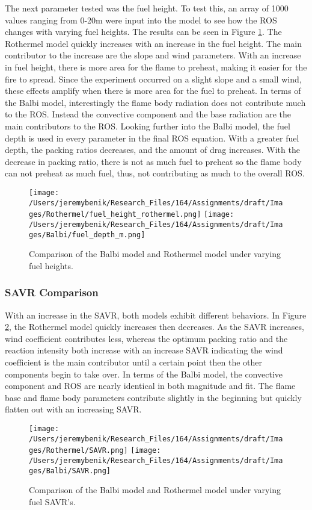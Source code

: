 \documentclass{article}
\begin{document}
\indent The next parameter tested was the fuel height. To test this, an array of 1000 values ranging from 0-20m were input into the model to see how the ROS changes with varying fuel heights. The results can be seen in Figure \ref{fuel height}. The Rothermel model quickly increases with an increase in the fuel height. The main contributor to the increase are the slope and wind parameters. With an increase in fuel height, there is more area for the flame to preheat, making it easier for the fire to spread. Since the experiment occurred on a slight slope and a small wind, these effects amplify when there is more area for the fuel to preheat. In terms of the Balbi model, interestingly the flame body radiation does not contribute much to the ROS. Instead the convective component and the base radiation are the main contributors to the ROS. Looking further into the Balbi model, the fuel depth is used in every parameter in the final ROS equation. With a greater fuel depth, the packing ratios decreases, and the amount of drag increases. With the decrease in packing ratio, there is not as much fuel to preheat so the flame body can not preheat as much fuel, thus, not contributing as much to the overall ROS.
\newpage
\begin{figure}[!h]
\centering
  \texttt{[image: /Users/jeremybenik/Research\_Files/164/Assignments/draft/Images/Rothermel/fuel\_height\_rothermel.png]}
  \texttt{[image: /Users/jeremybenik/Research\_Files/164/Assignments/draft/Images/Balbi/fuel\_depth\_m.png]}
  \caption{Comparison of the Balbi model and Rothermel model under varying fuel heights.}
  \label{fuel height}
\end{figure}
\subsubsection{SAVR Comparison}
\indent With an increase in the SAVR, both models exhibit different behaviors. In Figure \ref{SAVR}, the Rothermel model quickly increases then decreases. As the SAVR increases, wind coefficient contributes less, whereas the optimum packing ratio and the reaction intensity both increase with an increase SAVR indicating the wind coefficient is the main contributor until a certain point then the other components begin to take over. In terms of the Balbi model, the convective component and ROS are nearly identical in both magnitude and fit. The flame base and flame body parameters contribute slightly in the beginning but quickly flatten out with an increasing SAVR.
\newpage
\begin{figure}[!h]
\centering
  \texttt{[image: /Users/jeremybenik/Research\_Files/164/Assignments/draft/Images/Rothermel/SAVR.png]}
  \texttt{[image: /Users/jeremybenik/Research\_Files/164/Assignments/draft/Images/Balbi/SAVR.png]}
  \caption{Comparison of the Balbi model and Rothermel model under varying fuel SAVR's.}
  \label{SAVR}
\end{figure}
\end{document}

